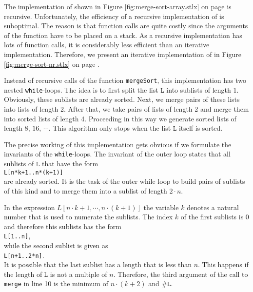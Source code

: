 \noindent
The implementation of  shown in Figure \ref{fig:merge-sort-array.stlx} on page
\pageref{fig:merge-sort-array.stlx} is recursive.  Unfortunately, the efficiency of a recursive
implementation of  is suboptimal.  The reason is that function calls are quite
costly since the arguments of the function have to be placed on a stack.  As a recursive
implementation has lots of function calls, it is considerably less efficient than an iterative
implementation.  Therefore, we present an iterative implementation of  in Figure
\ref{fig:merge-sort-nr.stlx} on page \pageref{fig:merge-sort-nr.stlx}.

Instead of recursive calls of the function \texttt{mergeSort}, this implementation has two nested 
\texttt{while}-loops.  The idea is to first split the list $\mathtt{L}$ into sublists of length 1.
Obviously, these sublists are already sorted.  Next, we merge pairs of these lists into lists of
length 2.  After that, we take pairs of lists of length 2 and merge them into sorted lists of length
4. Proceeding in this way we generate sorted lists of length
$8$, $16$, $\cdots$.  This algorithm only stops when the list $\mathtt{L}$ itself is sorted.

The precise working of this implementation gets obvious if we formulate the invariants of the
\texttt{while}-loops.  The invariant of the outer loop states that all sublists of $\mathtt{L}$ 
that have the form
\\[0.2cm]
\hspace*{1.3cm}
\texttt{L[n*k+1..n*(k+1)]}
\\[0.2cm]
are already sorted.  It is the task of the outer while loop to build pairs of sublists of this kind
and to merge them into a sublist of length $2 \cdot n$.

In the expression $L[n \cdot k + 1, \cdots, n \cdot (k+1)]$ the variable $k$ denotes a natural
number that is used to numerate the sublists.  The index $k$ of the first sublists is $0$ and
therefore this sublists has the form
\\[0.2cm]
\hspace*{1.3cm}
\texttt{L[1..n]},
\\[0.2cm]
while the second sublist is given as
\\[0.2cm]
\hspace*{1.3cm}
\texttt{L[n+1..2*n]}.
\\[0.2cm]
It is possible that the last sublist has a length that is less than $n$.  This happens if the length
of $\mathtt{L}$ is not a multiple of $n$.  Therefore, the third argument of the call to \texttt{merge}
in line 10 is the minimum of $n\cdot(k+2)$ and $\mathtt{\#L}$.

